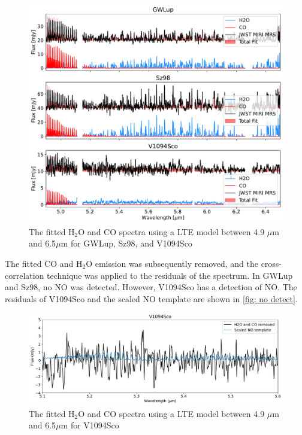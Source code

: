 \documentclass[twoside, single, authoryear, semicolon, 12pt]{lion-msc}
\newcommand{\4}{$_4$}
\newcommand{\3}{$_3$}
\newcommand{\2}{$_2$}
\begin{document}
\begin{figure}[H]
    \centering
    \includegraphics[width=\linewidth]{Figures/Fits.pdf}
    \caption{The fitted H\2O and CO spectra using a LTE model between 4.9 $\mu$m and 6.5$\mu$m for GWLup, Sz98, and V1094Sco}
    \label{fig: fits}
\end{figure}

The fitted CO and H\2O emission was subsequently removed, and the cross-correlation technique was applied to the residuals of the spectrum. In GWLup and Sz98, no NO was detected. However, V1094Sco has a detection of NO. The residuals of V1094Sco and the scaled NO template are shown in \autoref{fig: no detect}. 
\begin{figure}[H]
    \centering
    \includegraphics[width=\linewidth]{Figures/NO_Detect.pdf}
    \caption{The fitted H\2O and CO spectra using a LTE model between 4.9 $\mu$m and 6.5$\mu$m for V1094Sco}
    \label{fig: no detect}
\end{figure}
\end{document}
